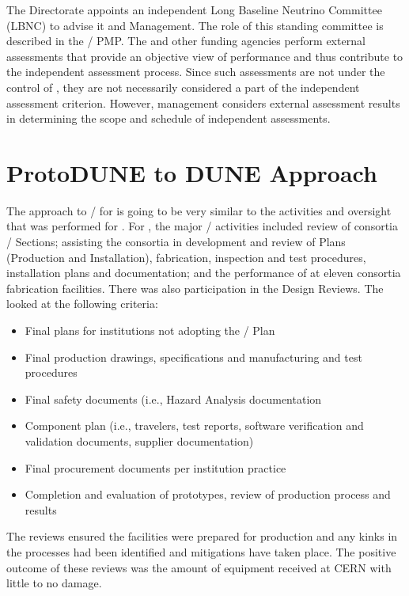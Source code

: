 The \fnal Directorate appoints an independent Long Baseline Neutrino
Committee (LBNC) to advise it and  Management. The role of
this standing committee is described in the /
PMP. The  and other funding agencies perform external
assessments that provide an objective view of performance and thus
contribute to the independent assessment process. Since such
assessments are not under the control of , they are not
necessarily considered a part of the independent assessment
criterion. However,  management considers external
assessment results in determining the scope and schedule of
independent assessments.

\section{ProtoDUNE to DUNE  Approach}

The approach to / for  is going to be
very similar to the activities and oversight that was performed for
.  For , the major
/ activities included review of consortia
 / Sections; assisting the consortia in
development and review of  Plans (Production and
Installation), fabrication, inspection and test procedures,
installation plans and documentation; and the performance of
 at eleven consortia fabrication facilities.  There was
also  participation in the  Design Reviews.
The  looked at the following criteria:
\begin{itemize}
  \item Final  plans for institutions not adopting the
    /  Plan
  \item Final production drawings, specifications and manufacturing
    and test procedures
  \item Final safety documents (i.e., Hazard Analysis documentation
  \item Component  plan (i.e., travelers, test reports,
    software verification and validation documents, supplier
    documentation)
  \item Final procurement documents per institution practice
  \item Completion and evaluation of prototypes, review of production
    process and  results
\end{itemize}
The reviews ensured the facilities
were prepared for production and any kinks in the processes had been
identified and mitigations have taken place. The positive outcome of
these reviews was the amount of equipment received at CERN with little
to no damage.

